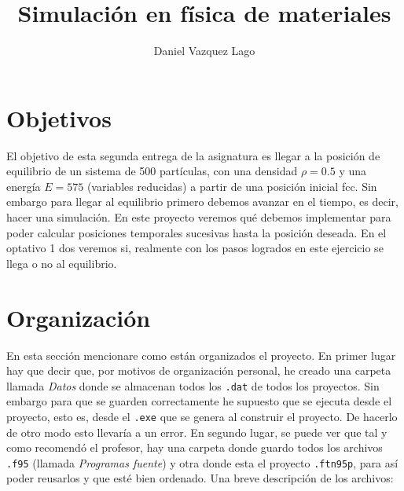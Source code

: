 \documentclass[11pt]{article} %
\author{Daniel Vazquez Lago}
\title{Simulación en física de materiales}
\begin{document}
	
	
\maketitle
\newpage
\tableofcontents
\section{Objetivos}

El objetivo de esta segunda entrega de la asignatura es llegar a la posición de equilibrio de un sistema de 500 partículas, con una densidad $\rho=0.5$ y una energía $E=575$ (variables reducidas) a partir de una posición inicial fcc. Sin embargo para llegar al equilibrio primero debemos avanzar en el tiempo, es decir, hacer una simulación. En este proyecto veremos qué debemos implementar para poder calcular posiciones temporales sucesivas hasta la posición deseada. En el optativo 1 dos veremos si, realmente con los pasos logrados en este ejercicio se llega o no al equilibrio.

\section{Organización}

En esta sección mencionare como están organizados el proyecto. En primer lugar hay que decir que, por motivos de organización personal, he creado una carpeta llamada \textit{Datos} donde se almacenan todos los \texttt{.dat} de todos los proyectos. Sin embargo para que se guarden correctamente he supuesto que se ejecuta desde el proyecto, esto es, desde el \texttt{.exe} que se genera al construir el proyecto. De hacerlo de otro modo esto llevaría a un error. En segundo lugar, se puede ver que tal y como recomendó el profesor, hay una carpeta donde guardo todos los archivos \texttt{.f95} (llamada \textit{Programas fuente}) y otra donde esta el proyecto \texttt{.ftn95p}, para así poder reusarlos y que esté bien ordenado. Una breve descripción de los archivos:
\end{document}
